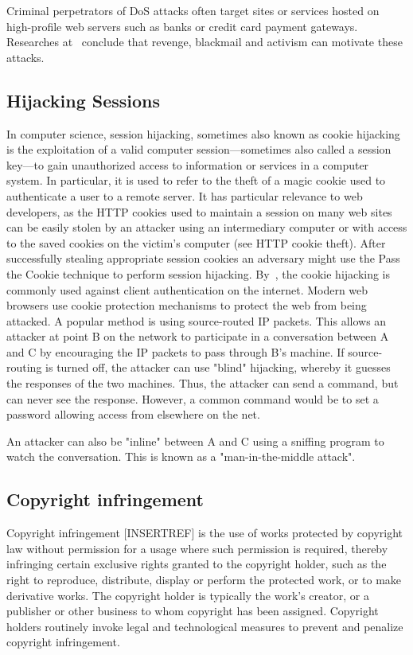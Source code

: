 Criminal perpetrators of DoS attacks often target sites or services hosted on high-profile web servers such as banks or
credit card payment gateways.
Researches at~\cite{prince2016empty, halpin2012philosophy} conclude that revenge, blackmail and activism can motivate these attacks.

\subsection{Hijacking Sessions}\label{subsec:hijacking-sessions}
In computer science, session hijacking, sometimes also known as cookie hijacking is the exploitation of a valid computer
session—sometimes also called a session key—to gain unauthorized access to information or services in a computer system.
In particular, it is used to refer to the theft of a magic cookie used to authenticate a user to a remote server.
It has particular relevance to web developers, as the HTTP cookies used to maintain a session on many web sites
can be easily stolen by an attacker using an intermediary computer or with access to the saved cookies on the victim's
computer (see HTTP cookie theft).
After successfully stealing appropriate session cookies an adversary might use the Pass the Cookie technique to perform
session hijacking.
By~\cite{bugliesi2015cookiext}, the cookie hijacking is commonly used against client authentication on the internet.
Modern web browsers use cookie protection mechanisms to protect the web from being attacked.
A popular method is using source-routed IP packets.
This allows an attacker at point B on the network to participate in a conversation between A and C by encouraging the
IP packets to pass through B's machine.
If source-routing is turned off, the attacker can use "blind" hijacking, whereby it guesses the responses of the two
machines.
Thus, the attacker can send a command, but can never see the response.
However, a common command would be to set a password allowing access from elsewhere on the net.

An attacker can also be "inline" between A and C using a sniffing program to watch the conversation.
This is known as a "man-in-the-middle attack".

\subsection{Copyright infringement}\label{subsec:copyright-infringement}
Copyright infringement [INSERTREF] is the use of works protected by copyright law without
permission for a usage where such permission is required, thereby infringing certain exclusive rights granted to the
copyright holder, such as the right to reproduce, distribute, display or perform the protected work, or to make
derivative works.
The copyright holder is typically the work's creator, or a publisher or other business to whom copyright has been assigned.
Copyright holders routinely invoke legal and technological measures to prevent and penalize copyright infringement.

